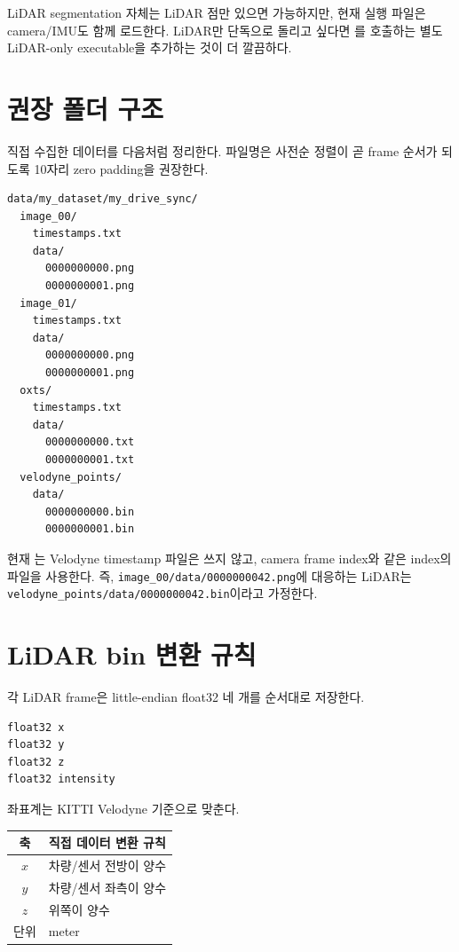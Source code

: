 \documentclass[11pt,a4paper,oneside]{report}
\begin{document}
\begin{warnbox}
LiDAR segmentation 자체는 LiDAR 점만 있으면 가능하지만, 현재 실행 파일은 camera/IMU도 함께 로드한다. LiDAR만 단독으로 돌리고 싶다면 를 호출하는 별도 LiDAR-only executable을 추가하는 것이 더 깔끔하다.
\end{warnbox}

\section{권장 폴더 구조}

직접 수집한 데이터를 다음처럼 정리한다. 파일명은 사전순 정렬이 곧 frame 순서가 되도록 10자리 zero padding을 권장한다.

\begin{lstlisting}
data/my_dataset/my_drive_sync/
  image_00/
    timestamps.txt
    data/
      0000000000.png
      0000000001.png
  image_01/
    timestamps.txt
    data/
      0000000000.png
      0000000001.png
  oxts/
    timestamps.txt
    data/
      0000000000.txt
      0000000001.txt
  velodyne_points/
    data/
      0000000000.bin
      0000000001.bin
\end{lstlisting}

현재 는 Velodyne timestamp 파일은 쓰지 않고, camera frame index와 같은 index의  파일을 사용한다. 즉, \texttt{image\_00/data/0000000042.png}에 대응하는 LiDAR는 \texttt{velodyne\_points/data/0000000042.bin}이라고 가정한다.

\section{LiDAR bin 변환 규칙}

각 LiDAR frame은 little-endian float32 네 개를 순서대로 저장한다.

\begin{lstlisting}
float32 x
float32 y
float32 z
float32 intensity
\end{lstlisting}

좌표계는 KITTI Velodyne 기준으로 맞춘다.

\begin{center}
\begin{tabularx}{0.85\linewidth}{@{}cX@{}}
\toprule
축 & 직접 데이터 변환 규칙 \\
\midrule
$x$ & 차량/센서 전방이 양수 \\
$y$ & 차량/센서 좌측이 양수 \\
$z$ & 위쪽이 양수 \\
단위 & meter \\
\bottomrule
\end{tabularx}
\end{center}
\end{document}
